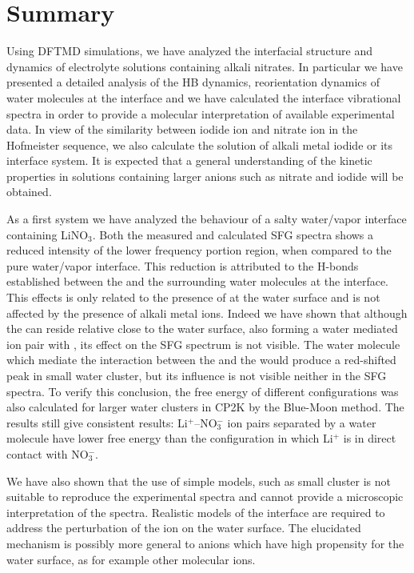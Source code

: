 \chapter{Summary}\label{CHAPTER_Summary}
Using DFTMD simulations, we have analyzed the interfacial structure and dynamics of electrolyte solutions containing alkali nitrates.
In particular we have presented a detailed analysis of the HB dynamics, reorientation dynamics of water molecules at the interface 
and we have calculated the interface vibrational spectra in order to provide a molecular interpretation of available experimental data. 
In view of the similarity between iodide ion and nitrate ion in the Hofmeister sequence, we also calculate the solution of alkali metal iodide
or its interface system. It is expected that a general understanding of the kinetic properties in solutions containing larger anions such as 
nitrate and iodide will be obtained.

As a first system we have analyzed the behaviour of a salty water/vapor interface containing LiNO$_3$.
Both the measured and calculated SFG spectra shows a reduced intensity of the lower frequency portion region, 
when compared to the pure water/vapor interface. 
This reduction is attributed to the H-bonds established between the \nitrate and the surrounding water molecules at the interface.
This effects is only related to the presence of \nitrate at the water surface and is not affected by the presence of alkali metal ions.
Indeed we have shown that although the \Li can reside relative close to the water surface, also forming a water mediated
ion pair with \nit, its effect on the SFG spectrum is not visible. The water molecule which mediate the interaction 
between the \nitrate and the \Li would produce a red-shifted peak in small water cluster, but its influence is not visible 
neither in the SFG spectra. To verify this conclusion, the free energy of different configurations was also calculated for 
larger water clusters in CP2K by the Blue-Moon method. The results still give consistent results: Li$^+$--NO$_3^-$ ion pairs 
separated by a water molecule have lower free energy than the configuration in which Li$^+$ is in direct contact with NO$_3^-$. 

We have also shown that the use of simple models, such as small cluster is not suitable to reproduce the experimental spectra 
and cannot provide a microscopic interpretation of the spectra. Realistic models of the interface are required to address the 
perturbation of the ion on the water surface. The elucidated mechanism is possibly more general to anions which have high 
propensity for the water surface, as for example other molecular ions.



